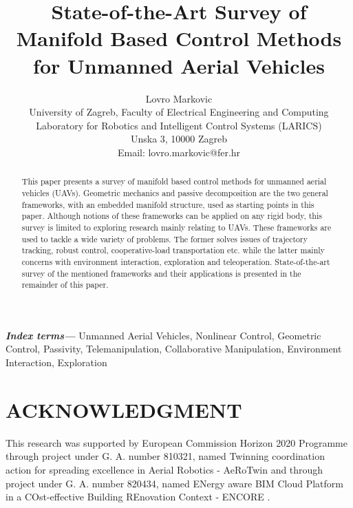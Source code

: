 \documentclass[letterpaper, 10 pt, conference]{ieeeconf}  %
\title{\LARGE \bf
State-of-the-Art Survey of Manifold Based Control Methods for Unmanned Aerial Vehicles
}
\author{Lovro Markovic \\
	University of Zagreb, Faculty of Electrical Engineering and Computing \\
	Laboratory for Robotics and Intelligent Control Systems (LARICS) \\
	Unska 3, 10000 Zagreb \\
	Email: lovro.markovic@fer.hr
}
\providecommand{\indexterms}[1]{\textbf{\textit{Index terms---}} #1}
\begin{document}
\maketitle

\thispagestyle{empty}
\pagestyle{empty}


\begin{abstract}
This paper presents a survey of manifold based control methods for unmanned aerial vehicles (UAVs). 
Geometric mechanics and passive decomposition are the two general frameworks, with an embedded manifold structure, used as starting points in this paper. Although notions of these frameworks can be applied on any rigid body, this survey is limited to exploring research mainly relating to UAVs. These frameworks are used to tackle a wide variety of problems. The former solves issues of trajectory tracking, robust control, cooperative-load transportation etc. while the latter mainly concerns with environment interaction, exploration and teleoperation. State-of-the-art survey of the mentioned frameworks and their applications is presented in the remainder of this paper.
\end{abstract}

\indexterms{Unmanned Aerial Vehicles, Nonlinear Control, Geometric Control, Passivity, Telemanipulation, Collaborative Manipulation, Environment Interaction, Exploration}







%


\section*{ACKNOWLEDGMENT}

This research was supported by European Commission Horizon 2020 Programme through project under G. A. number 810321, named Twinning coordination action for spreading excellence in Aerial Robotics - AeRoTwin \cite{AEROTWINweb} and through project under G. A. number 820434, named ENergy aware BIM Cloud Platform in a COst-effective Building REnovation Context - ENCORE \cite{ENCOREweb}.



\end{document}
